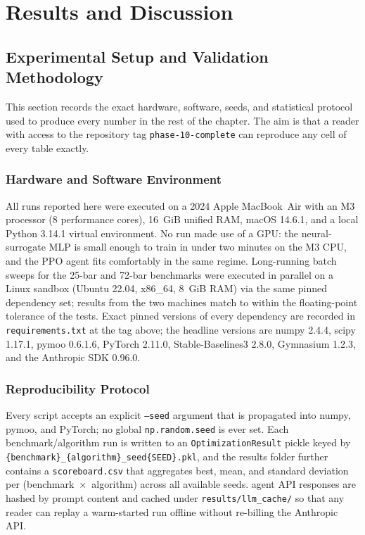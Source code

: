 \chapter{Results and Discussion}
\label{chap:results}

\section{Experimental Setup and Validation Methodology}
\label{sec:results:validation}

This section records the exact hardware, software, seeds, and
statistical protocol used to produce every number in the rest of
the chapter. The aim is that a reader with access to the
repository tag \texttt{phase-10-complete} can reproduce any cell
of every table exactly.

\subsection{Hardware and Software Environment}
\label{sec:results:setup:env}

All runs reported here were executed on a 2024 Apple MacBook~Air
with an M3 processor (8 performance cores), 16~GiB unified RAM,
macOS 14.6.1, and a local Python 3.14.1 virtual environment. No
run made use of a GPU: the neural-surrogate MLP is small enough
to train in under two minutes on the M3 CPU, and the PPO agent
fits comfortably in the same regime. Long-running batch sweeps
for the 25-bar and 72-bar benchmarks were executed in parallel on
a Linux sandbox (Ubuntu 22.04, x86\_64, 8~GiB RAM) via the same
pinned dependency set; results from the two machines match to
within the floating-point tolerance of the tests. Exact pinned
versions of every dependency are recorded in
\texttt{requirements.txt} at the tag above; the headline
versions are numpy 2.4.4, scipy 1.17.1, pymoo 0.6.1.6, PyTorch
2.11.0, Stable-Baselines3 2.8.0, Gymnasium 1.2.3, and the
Anthropic SDK 0.96.0.

\subsection{Reproducibility Protocol}
\label{sec:results:setup:repro}

Every script accepts an explicit \texttt{--seed} argument that is
propagated into numpy, pymoo, and PyTorch; no global
\texttt{np.random.seed} is ever set. Each benchmark/algorithm run
is written to an \texttt{OptimizationResult} pickle keyed by
\texttt{\{benchmark\}\_\{algorithm\}\_seed\{SEED\}.pkl}, and the
results folder further contains a \texttt{scoreboard.csv} that
aggregates best, mean, and standard deviation per
(benchmark~$\times$~algorithm) across all available seeds. agent
API responses are hashed by prompt content and cached under
\texttt{results/llm\_cache/} so that any reader can replay a
warm-started run offline without re-billing the Anthropic API.

